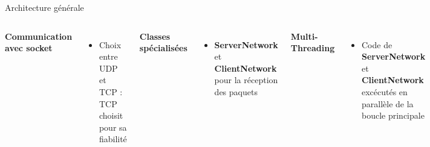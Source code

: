 \documentclass{beamer}
\begin{document}
\begin{frame}[fragile]{Architecture générale}
    \begin{columns}
    \textbf{Communication avec socket}
        \begin{itemize}
            \item Choix entre UDP et TCP : TCP choisit pour sa fiabilité
        \end{itemize}
    \vspace{0.3cm}
    \textbf{Classes spécialisées}
        \begin{itemize}
            \item \textbf{ServerNetwork} et \textbf{ClientNetwork} pour la réception des paquets
        \end{itemize}
    \vspace{0.3cm}
    \textbf{Multi-Threading}
    \begin{itemize}
            \item Code de \textbf{ServerNetwork} et \textbf{ClientNetwork} excécutés en parallèle de la boucle principale
    \end{itemize}
    

    \end{columns}
\end{frame}
\end{document}
